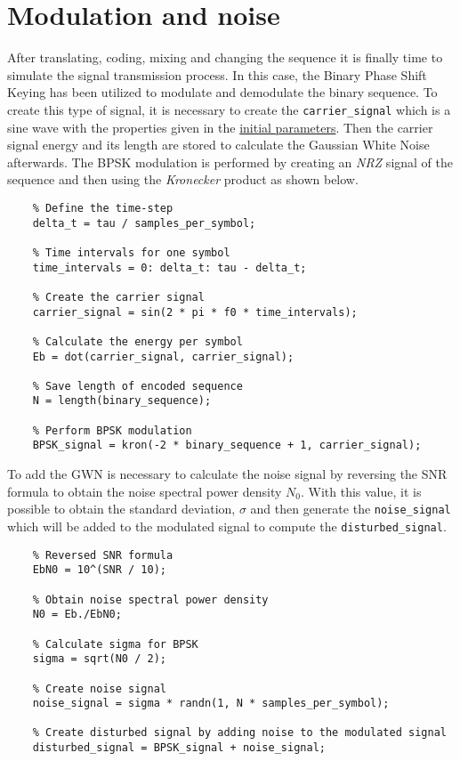 \vspace{40px} \section{Modulation and noise}\label{modulation}
After translating, coding, mixing and changing the sequence it is finally time to simulate the signal transmission process. In this case, the Binary Phase Shift Keying has been utilized to modulate and demodulate the binary sequence. To create this type of signal, it is necessary to create the \texttt{carrier\_signal} which is a sine wave with the properties given in the \hyperref[initial-parameters]{initial parameters}. Then the carrier signal energy and its length are stored to calculate the Gaussian White Noise afterwards. The BPSK modulation is performed by creating an \textsl{NRZ} signal of the sequence and then using the \textit{Kronecker} product as shown below.

\begin{lstlisting}
    % Define the time-step
    delta_t = tau / samples_per_symbol;
    
    % Time intervals for one symbol
    time_intervals = 0: delta_t: tau - delta_t;
    
    % Create the carrier signal
    carrier_signal = sin(2 * pi * f0 * time_intervals);
    
    % Calculate the energy per symbol
    Eb = dot(carrier_signal, carrier_signal);
    
    % Save length of encoded sequence
    N = length(binary_sequence);
    
    % Perform BPSK modulation
    BPSK_signal = kron(-2 * binary_sequence + 1, carrier_signal);

\end{lstlisting}

\label{noise}\noindent To add the GWN is necessary to calculate the noise signal by reversing the SNR formula to obtain the noise spectral power density $N_0$. With this value, it is possible to obtain the standard deviation, $\sigma$ and then generate the \texttt{noise\_signal} which will be added to the modulated signal to compute the \texttt{disturbed\_signal}.

\begin{lstlisting}
    % Reversed SNR formula
    EbN0 = 10^(SNR / 10);
    
    % Obtain noise spectral power density
    N0 = Eb./EbN0;
    
    % Calculate sigma for BPSK
    sigma = sqrt(N0 / 2);
    
    % Create noise signal
    noise_signal = sigma * randn(1, N * samples_per_symbol);
    
    % Create disturbed signal by adding noise to the modulated signal
    disturbed_signal = BPSK_signal + noise_signal;
\end{lstlisting}

